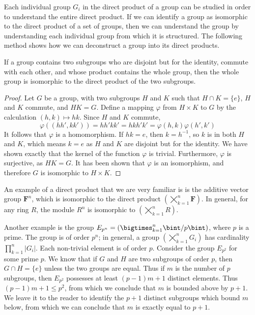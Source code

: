 Each individual group $G_i$ in the direct product of a group can be studied in order to understand the entire direct product. If we can identify a group as isomorphic to the direct product of a set of groups, then we can understand the group by understanding each individual group from which it is structured. The following method shows how we can deconstruct a group into its direct products.

\begin{theorem}
    If a group contains two subgroups who are disjoint but for the identity, commute with each other, and whose product contains the whole group, then the whole group is isomorphic to the direct product of the two subgroups.
\end{theorem}
\begin{proof}
    Let $G$ be a group, with two subgroups $H$ and $K$ such that $H \cap K = \{e\}$, $H$ and $K$ commute, and $HK = G$. Define a mapping $\varphi$ from $H \times K$ to $G$ by the calculation $(h,k) \mapsto hk$. Since $H$ and $K$ commute,
    \[ \varphi((hh',kk')) = hh'kk' = hkh'k' = \varphi(h,k) \varphi(h',k') \]
    It follows that $\varphi$ is a homomorphism. If $hk = e$, then $k = h^{-1}$, so $k$ is in both $H$ and $K$, which means $k = e$ as $H$ and $K$ are disjoint but for the identity. We have shown exactly that the kernel of the function $\varphi$ is trivial. Furthermore, $\varphi$ is surjective, as $HK = G$. It has been shown that $\varphi$ is an isomorphism, and therefore $G$ is isomorphic to $H \times K$.
\end{proof}

An example of a direct product that we are very familiar is is the additive vector group $\mathbf{F}^n$, which is isomorphic to the direct product $(\bigtimes_{k = 1}^n \mathbf{F})$. In general, for any ring $R$, the module $R^n$ is isomorphic to $(\bigtimes_{k = 1}^n R)$.

Another example is the group $E_{p^n} = (\bigtimes_{k=1}^n \bint/p\bint)$, where $p$ is a prime. The group is of order $p^n$; in general, a group $(\bigtimes_{k=1}^n G_i)$ has cardinality $\prod_{k=1}^n |G_i|$. Each non-trivial element is of order $p$. Consider the group $E_{p^2}$ for some prime $p$. We know that if $G$ and $H$ are two subgroups of order $p$, then $G \cap H = \{e\}$ unless the two groups are equal. Thus if $m$ is the number of $p$ subgroups, then $E_{p^2}$ possesses at least $(p - 1)m + 1$ distinct elements. Thus $(p - 1)m + 1 \leq p^2$, from which we conclude that $m$ is bounded above by $p + 1$. We leave it to the reader to identify the $p + 1$ distinct subgroups which bound $m$ below, from which we can conclude that $m$ is exactly equal to $p + 1$.

